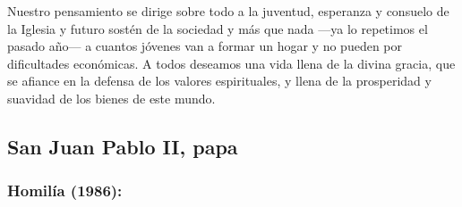 \begin{body}
					Nuestro pensamiento se dirige sobre todo a la juventud, esperanza y consuelo de la Iglesia y futuro sostén de la sociedad y más que nada ---ya lo repetimos el pasado año--- a cuantos jóvenes van a formar un hogar y no pueden por dificultades económicas. A todos deseamos una vida llena de la divina gracia, que se afiance en la defensa de los valores espirituales, y llena de la prosperidad y suavidad de los bienes de este mundo.
				\end{body}
			
	\newsection
					
		\subsection{San Juan Pablo II, papa}
		
			\subsubsection{Homilía (1986):} 
				
				
